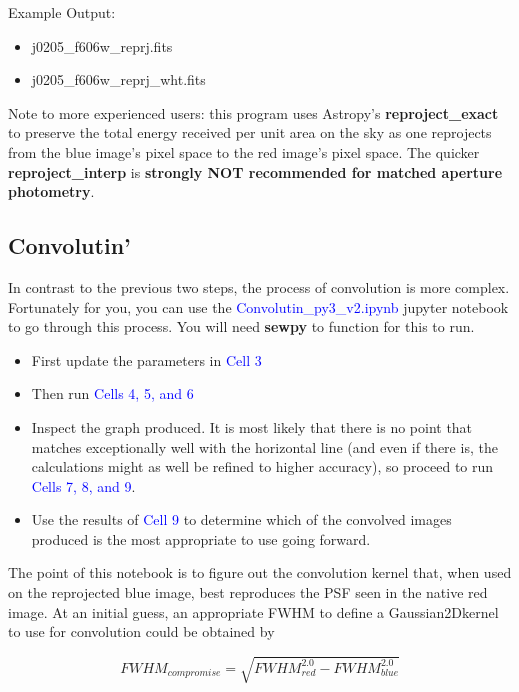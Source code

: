 \documentclass[a4paper,10pt]{article}
\begin{document}
\noindent Example Output: 
\begin{itemize}
\setlength{\itemsep}{-5pt}
 \item j0205\_f606w\_reprj.fits
 \item j0205\_f606w\_reprj\_wht.fits
\end{itemize}


Note to more experienced users: this program uses Astropy's \textbf{reproject\_exact} to preserve the total energy received per unit area on the sky as one reprojects from the blue image's pixel space to the red image's pixel space. The quicker \textbf{reproject\_interp} is \textbf{strongly NOT recommended for matched aperture photometry}.
\subsection{Convolutin'}

In contrast to the previous two steps, the process of convolution is more complex. Fortunately for you, you can use the \textcolor{blue}{Convolutin\_py3\_v2.ipynb} jupyter notebook to go through this process. You will need \textbf{sewpy} to function for this to run. 

\begin{itemize}
 \item First update the parameters in \textcolor{blue}{Cell 3}
 \item Then run \textcolor{blue}{Cells 4, 5, and 6}
 \item Inspect the graph produced. It is most likely that there is no point that matches exceptionally well with the horizontal line (and even if there is, the calculations might as well be refined to higher accuracy), so proceed to run \textcolor{blue}{Cells 7, 8, and 9}.
 \item Use the results of \textcolor{blue}{Cell 9} to determine which of the convolved images produced is the most appropriate to use going forward. 
\end{itemize}


\noindent The point of this notebook is to figure out the convolution kernel that, when used on the reprojected blue image, best reproduces the PSF seen in the native red image. At an initial guess, an appropriate FWHM to define a Gaussian2Dkernel to use for convolution could be obtained by 

\begin{equation}
 FWHM_{compromise}=\sqrt{FWHM_{red}^{2.0}-FWHM_{blue}^{2.0}}
\end{equation}
\end{document}
